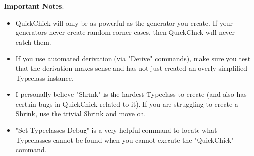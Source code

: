 \documentclass{article}
\begin{document}
    \textbf{Important Notes}:
    \begin{itemize}
      \item QuickChick will only be as powerful as the generator you create. If your generators never create random corner cases, then QuickChick will never catch them.
      \item If you use automated derivation (via "Derive" commands), make sure you test that the derivation makes sense and has not just created an overly simplified Typeclass instance.
      \item I personally believe "Shrink" is the hardest Typeclass to create (and also has certain bugs in QuickChick related to it). If you are struggling to create a Shrink, use the trivial Shrink and move on.
      \item "Set Typeclasses Debug" is a very helpful command to locate what Typeclasses cannot be found when you cannot execute the "QuickChick" command.
    \end{itemize}
\end{document}
